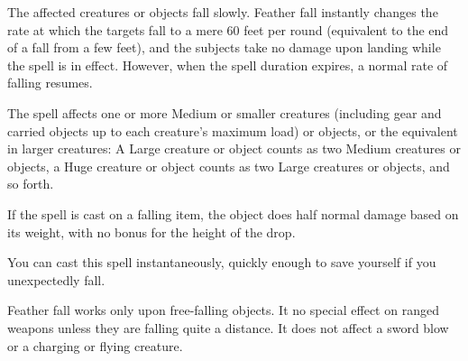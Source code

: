 \spellrng{\rngmed}
\begin{spelleffect}
  The affected creatures or objects fall slowly. Feather fall instantly changes the rate at which the targets fall to a mere 60 feet per round (equivalent to the end of a fall from a few feet), and the subjects take no damage upon landing while the spell is in effect. However, when the spell duration expires, a normal rate of falling resumes.
  \par The spell affects one or more Medium or smaller creatures (including gear and carried objects up to each creature's maximum load) or objects, or the equivalent in larger creatures: A Large creature or object counts as two Medium creatures or objects, a Huge creature or object counts as two Large creatures or objects, and so forth.
  \par If the spell is cast on a falling item, the object does half normal damage based on its weight, with no bonus for the height of the drop.
\end{spelleffect}
\begin{spellnotes}
  You can cast this spell instantaneously, quickly enough to save yourself if you unexpectedly fall. 
  \par Feather fall works only upon free-falling objects. It no special effect on ranged weapons unless they are falling quite a distance. It does not affect a sword blow or a charging or flying creature.
\end{spellnotes}

